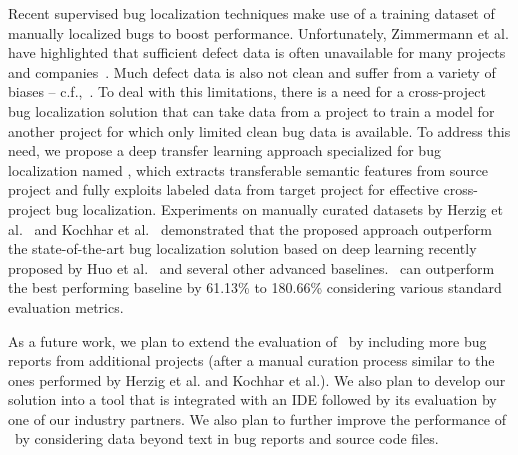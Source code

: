 Recent supervised bug localization techniques make use of a training dataset of manually localized bugs to boost performance. Unfortunately, Zimmermann et al. have highlighted that sufficient defect data is often unavailable for many projects and companies~\cite{ZimmermannNGGM09}. Much defect data is also not clean and suffer from a variety of biases -- c.f.,~\cite{HerzigJZ13,KochharTL14,BachmannBRDB10,BirdBADBFD09}. To deal with this limitations, there is a need for a cross-project bug localization solution that can take data from a project to train a model for another project for which only limited clean bug data is available. To address this need, we propose a deep transfer learning approach specialized for bug localization named \TRANPCNN, which extracts transferable semantic features from source project and fully exploits labeled data from target project for effective cross-project bug localization. Experiments on manually curated datasets by Herzig et al.~\cite{HerzigJZ13} and Kochhar et al.~\cite{KochharTL14} demonstrated that the proposed approach outperform the state-of-the-art bug localization solution based on deep learning recently proposed by Huo et al.~\cite{huo2016learning} and several other advanced baselines. \TRANPCNN\ can outperform the best performing baseline by 61.13\% to 180.66\% considering various standard evaluation metrics.

As a future work, we plan to extend the evaluation of \TRANPCNN\ by including more bug reports from additional projects (after a manual curation process similar to the ones performed by Herzig et al. and Kochhar et al.). We also plan to develop our solution into a tool that is integrated with an IDE followed by its evaluation by one of our industry partners. We also plan to further improve the performance of \TRANPCNN\ by considering data beyond text in bug reports and source code files. 
